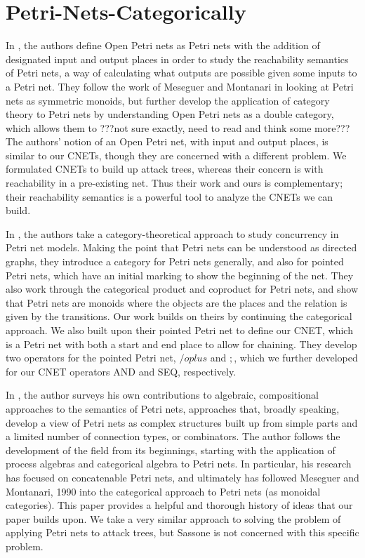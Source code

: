 \section{Petri-Nets-Categorically}
In \cite{2018arXiv180805415B}, the authors define Open Petri nets as Petri nets with the addition of designated input and output places in order to study the reachability semantics of Petri nets, a way of calculating what outputs are possible given some inputs to a Petri net. They follow the work of Meseguer and Montanari in looking at Petri nets as symmetric monoids, but further develop the application of category theory to Petri nets by understanding Open Petri nets as a double category, which allows them to ???not sure exactly, need to read and think some more??? The authors' notion of an Open Petri net, with input and output places, is similar to our CNETs, though they are concerned with a different problem. We formulated CNETs to build up attack trees, whereas their concern is with reachability in a pre-existing net. Thus their work and ours is complementary; their reachability semantics is a powerful tool to analyze the CNETs we can build.
\par In \cite{MESEGUER1990105}, the authors take a category-theoretical approach to study concurrency in Petri net models. Making the point that Petri nets can be understood as directed graphs, they introduce a category for Petri nets generally, and also for pointed Petri nets, which have an initial marking to show the beginning of the net. They also work through the categorical product and coproduct for Petri nets, and show that Petri nets are monoids where the objects are the places and the relation is given by the transitions. Our work builds on theirs by continuing the categorical approach. We also built upon their pointed Petri net to define our CNET, which is a Petri net with both a start and end place to allow for chaining. They develop two operators for the pointed Petri net, $/oplus$ and $;$, which we further developed for our CNET operators AND and SEQ, respectively.  
\par In \cite{soton261825}, the author surveys his own contributions to algebraic, compositional approaches to the semantics of Petri nets, approaches that, broadly speaking, develop a view of Petri nets as complex structures built up from simple parts and a limited number of connection types, or combinators. The author follows the development of the field from its beginnings, starting with the application of process algebras and categorical algebra to Petri nets. In particular, his research has focused on concatenable Petri nets, and ultimately has followed Meseguer and Montanari, 1990 into the categorical approach to Petri nets (as monoidal categories). This paper provides a helpful and thorough history of ideas that our paper builds upon. We take a very similar approach to solving the problem of applying Petri nets to attack trees, but Sassone is not concerned with this specific problem. 
